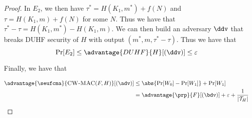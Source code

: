 \documentclass[11pt,a4paper]{article}
\begin{document}
\begin{proof}
In $E_2$, we then have $\tau^* = H(K_1, m^*) + f(N)$ and $\tau = H(K_1, m) + f(N)$ for some $N$. Thus we have that $\tau^* - \tau = H(K_1, m^*) - H(K_1, m)$. We can then build an adversary $\ddv$ that breaks DUHF security of $H$ with output $(m^*, m, \tau^* - \tau)$. Thus we have that 
$$
\Pr[E_2] \leq \advantage{DUHF}{H}[(\ddv)] \leq \varepsilon
$$

Finally, we have that 

$$
\begin{aligned}
\advantage{\seufcma}{\textsc{CW-MAC}(F,H)}[(\adv)] 
&\leq \abs{\Pr[W_0] - \Pr[W_1]} + \Pr[W_1] \\ 
&= \advantage{\prp}{F}[(\bdv)] + \varepsilon + \frac{1}{|\mathcal{T}_H|}
\end{aligned}
$$


\end{proof}
\end{document}
